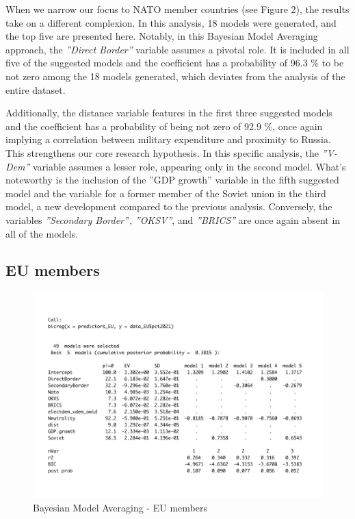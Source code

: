 \documentclass[12pt,a4paper]{article}
\begin{document}
When we narrow our focus to NATO member countries (see Figure 2), the results take on a different complexion. In this analysis, 18 models were generated, and the top five are presented here. Notably, in this Bayesian Model Averaging approach, the \textit{''Direct Border''} variable assumes a pivotal role. It is included in all five of the suggested models and the coefficient has a probability of 96.3 \% to be not zero among the 18 models generated, which deviates from the analysis of the entire dataset.

Additionally, the distance variable features in the first three suggested models and the coefficient has a probability of being not zero of 92.9 \%, once again implying a correlation between military expenditure and proximity to Russia. This strengthens our core research hypothesis. In this specific analysis, the \textit{''V-Dem''} variable assumes a lesser role, appearing only in the second model. What's noteworthy is the inclusion of the ''GDP growth'' variable in the fifth suggested model and the variable for a former member of the Soviet union in the third model, a new development compared to the previous analysis. Conversely, the variables \textit{''Secondary Border'}', \textit{''OKSV''}, and\textit{ ''BRICS''} are once again absent in all of the models. 


\subsection{EU members}
\begin{figure}[h]
\center
\label{F:1}
\includegraphics[scale=0.5]{BMA_EU}
\caption{Bayesian Model Averaging - EU members}
\end{figure}
\end{document}
